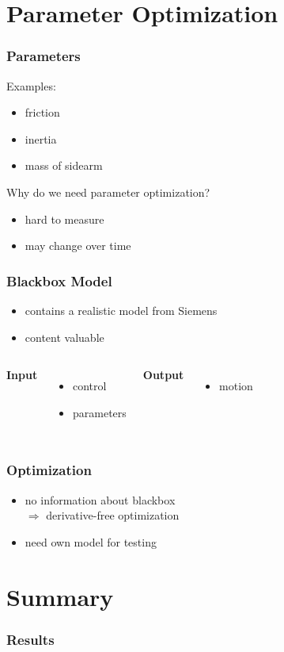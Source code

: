 \documentclass{beamer}
\begin{document}

\section{Parameter Optimization}

\begin{frame}[c]
\frametitle{Parameters}
Examples:
\begin{itemize}
	\item{friction}
	\item{inertia}
	\item{mass of sidearm}
\end{itemize}
\vspace{0.5cm}
Why do we need parameter optimization?
\begin{itemize}
	\item{hard to measure}
	\item{may change over time}
\end{itemize}
\end{frame}

\begin{frame}[c]
\frametitle{Blackbox Model}
\begin{itemize}
	\item{contains a realistic model from Siemens}
	\item{content valuable}
\end{itemize}
\vspace{0.5cm}
\begin{columns}[t]
		\textbf{Input}
		\begin{itemize}
			\item{control}
			\item{parameters}
		\end{itemize}
		\textbf{Output}
		\begin{itemize}
			\item{motion}
		\end{itemize}
\end{columns}
\end{frame}

\begin{frame}
\frametitle{Optimization}
\begin{itemize}
	\item{no information about blackbox \\ $\Rightarrow$ derivative-free optimization}
	\vspace{0.5cm}
	\item{need own model for testing}
\end{itemize}
\end{frame}


\section{Summary}

\begin{frame}[c]
\frametitle{Results}
\end{frame}
\end{document}
